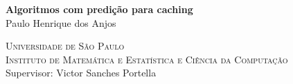 \thispagestyle{empty}

\begin{center}
    \vspace*{2.6cm}
    \textbf{\Large{Algoritmos com predição para caching}}\\

    \vspace*{1.3cm}
    \Large{Paulo Henrique dos Anjos}

    \vspace*{2.2cm} \textsc{
      Universidade de São Paulo\\[-0.12cm]
      Instituto de Matemática e Estatística e Ciência da Computação\\[-0.12cm]
    }
  \vskip 1.6cm
    Supervisor: Victor Sanches Portella\\
\end{center}
